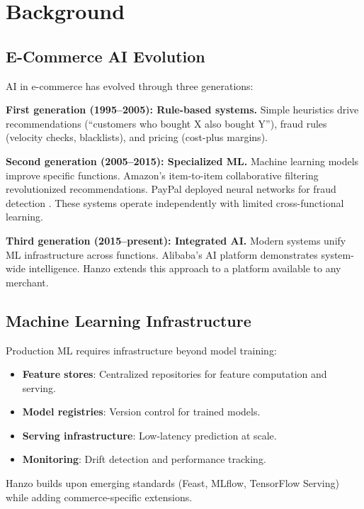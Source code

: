 \section{Background}


\subsection{E-Commerce AI Evolution}

AI in e-commerce has evolved through three generations:

\textbf{First generation (1995--2005): Rule-based systems.} Simple heuristics drive recommendations (``customers who bought X also bought Y''), fraud rules (velocity checks, blacklists), and pricing (cost-plus margins).

\textbf{Second generation (2005--2015): Specialized ML.} Machine learning models improve specific functions. Amazon's item-to-item collaborative filtering \cite{linden2003} revolutionized recommendations. PayPal deployed neural networks for fraud detection \cite{paypal2013}. These systems operate independently with limited cross-functional learning.

\textbf{Third generation (2015--present): Integrated AI.} Modern systems unify ML infrastructure across functions. Alibaba's AI platform \cite{alibaba2017} demonstrates system-wide intelligence. Hanzo extends this approach to a platform available to any merchant.

\subsection{Machine Learning Infrastructure}

Production ML requires infrastructure beyond model training:

\begin{itemize}
\item \textbf{Feature stores}: Centralized repositories for feature computation and serving.
\item \textbf{Model registries}: Version control for trained models.
\item \textbf{Serving infrastructure}: Low-latency prediction at scale.
\item \textbf{Monitoring}: Drift detection and performance tracking.
\end{itemize}

Hanzo builds upon emerging standards (Feast, MLflow, TensorFlow Serving) while adding commerce-specific extensions.

